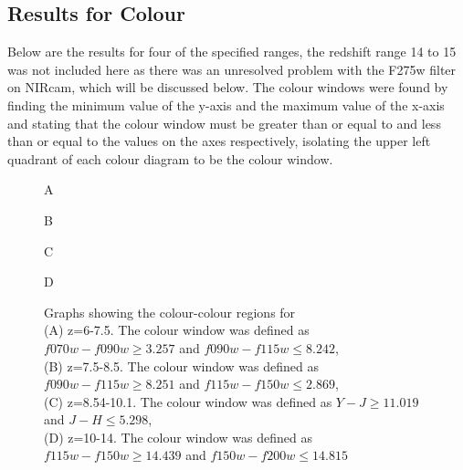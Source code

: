 	\subsection{Results for Colour} %
	\label{sub:Results_for_Colour}
		Below are the results for four of the specified ranges, the redshift range 14 to 15 was not included here as there was an unresolved problem with the F275w filter on NIRcam, which will be discussed below. The colour windows were found by finding the minimum value of the y-axis and the maximum value of the x-axis and stating that the colour window must be greater than or equal to and less than or equal to the values on the axes respectively, isolating the upper left quadrant of each colour diagram to be the colour window.
		\begin{figure}[htbp]
			\begin{minipage}[c]{0.5\linewidth}
				\centering
					\begingroup{}
						\resizebox{\textwidth}{!}{%
							
						}\endgroup
				\caption{A\label{fig:col1}}
			\end{minipage}
			\begin{minipage}[c]{0.5\linewidth}
				\centering
					\begingroup{}
						\resizebox{\textwidth}{!}{%
							
						}\endgroup
				\caption{B\label{fig:col2}}
			\end{minipage}
			\begin{minipage}[c]{0.5\linewidth}
				\centering
					\begingroup{}
						\resizebox{\textwidth}{!}{%
							
						}\endgroup
				\caption{C\label{fig:col3}}
			\end{minipage}
			\begin{minipage}[c]{0.5\linewidth}
				\centering
					\begingroup{}
						\resizebox{\textwidth}{!}{%
							
						}\endgroup
				\caption{D\label{fig:col4}}
			\end{minipage}
			\caption{Graphs showing the colour-colour regions for \\
			(A) z=6-7.5. The colour window was defined as $f070w-f090w{\ge}3.257$ and $f090w-f115w{\le}8.242$,\\
			(B) z=7.5-8.5. The colour window was defined as $f090w-f115w{\ge}8.251$ and $f115w-f150w{\le}2.869$, \\
			(C) z=8.54-10.1. The colour window was defined as $Y-J{\ge}11.019$ and $J-H{\le}5.298$, \\
			(D) z=10-14. The colour window was defined as $f115w-f150w{\ge}14.439$ and $f150w-f200w{\le}14.815$}
		\end{figure}

